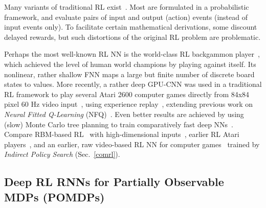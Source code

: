 \documentclass[letterpaper]{article}
\begin{document}
\begin{CJK*}{UTF8}{gbsn}
Many variants of traditional RL exist~\citep[e.g.,][]{BartoSuttonAnderson:83,Watkins:89,WatkinsDayan:92,Moore:93,Schwartz:93,Rummery:94,Singh:94R,Baird:95,Kaelbling:95,Peng:96,Mahadevan:96,Tsitsiklis:96,96-BradtkeLstd,Santamaria:97,prwu97,Sutton:98,Wiering:98,baird:nips12,meuleau:icuai99,Doya:00,Bertsekas:01,brafman02,Abounadi:02,03-LspiLagoudakis,09-Gtd,10-GqLambda,hasselt2012}.
Most are formulated in a probabilistic framework,
and evaluate pairs of input and output (action) events (instead of input events only).
To facilitate certain mathematical derivations,
some discount delayed rewards,
but such distortions of the original RL problem are problematic.

Perhaps the most well-known RL NN is the  world-class RL backgammon player~\citep{Tesauro:94},
which achieved the level of human world champions by playing against itself.
Its nonlinear, rather shallow FNN maps a large but finite
number of discrete board states to values.   
More recently, a rather deep GPU-CNN  was used in
a traditional RL framework  to play several Atari 2600 computer games directly from 
84x84 pixel 60 Hz video input~\citep{atari2013},
using experience replay~\citep{Lin:93},
extending previous work on {\em Neural Fitted Q-Learning} (NFQ)~\citep{nfq}.
Even better results are achieved by using (slow) Monte Carlo tree planning to
train comparatively fast deep NNs~\citep{atarimcts2014}.
Compare RBM-based RL~\citep{sallans2004} with high-dimensional inputs~\citep{elfwing2010},
earlier RL Atari players~\citep{gruettner2010multi},
and an earlier, raw video-based RL NN for computer games~\citep{koutnik:gecco13} trained by {\em Indirect Policy Search}
(Sec.~\ref{comrl}). 


\subsection{Deep RL RNNs for Partially Observable MDPs (POMDPs)}
\label{pomrl}


\end{CJK*}
\end{document}
